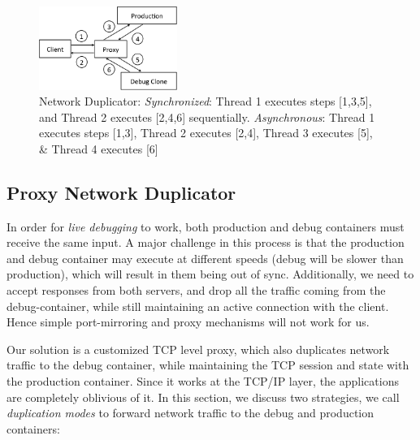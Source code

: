 \begin{figure}[ht]
  \begin{centering}
    \includegraphics[width=0.4\textwidth]{figs/network_dup.pdf}
    \caption{Network Duplicator: \textit{Synchronized}: Thread 1 executes steps [1,3,5], and Thread 2 executes [2,4,6] sequentially. \textit{Asynchronous}: Thread 1 executes steps [1,3], Thread 2 executes [2,4], Thread 3 executes [5], \& Thread 4 executes [6]}
    \label{fig:duplicator}
  \end{centering}
\end{figure}

\vspace{-0.5cm}
\subsection{Proxy Network Duplicator} 
\label{sec:proxyDuplicator}

In order for \textit{live debugging} to work, both production and debug containers must receive the same input.
A major challenge in this process is that the production and debug container may execute at different speeds (debug will be slower than production), which will result in them being out of sync.
Additionally, we need to accept responses from both servers, and drop all the traffic coming from the debug-container, while still maintaining an active connection with the client.
Hence simple port-mirroring and proxy mechanisms will not work for us.

Our solution is a customized TCP level proxy, which also duplicates network traffic to the debug container, while maintaining the TCP session and state with the production container. 
Since it works at the TCP/IP layer, the applications are completely oblivious of it.
In this section, we discuss two strategies, we call \textit{duplication modes} to forward network traffic to the debug and production containers:
%

